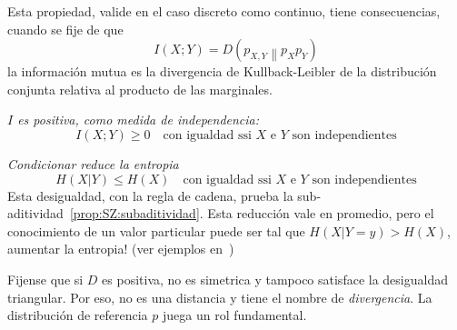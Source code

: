 
Esta propiedad, valide  en el caso discreto como  continuo, tiene consecuencias,
cuando  se fije  de que
%
\[
I(X;Y) = D \left( \left. p_{X,Y} \right\| p_X p_Y \right)
\]
%
\ie  la  informaci\'on  mutua  es  la  divergencia  de  Kullback-Leibler  de  la
distribuci\'on conjunta relativa al producto de las marginales.
%
\begin{propiedades}
\item\label{prop:SZ:Ipositive}   {\it   $I$   es   positiva,  como   medida   de
    independencia:}
  \[
  I(X;Y) \ge 0 \quad \mbox{con igualdad ssi $X$ e $Y$ son independientes}
  \]
%
\item\label{prop:SZ:condicionar} {\it  Condicionar reduce la  entropia}
  \[
  H(X|Y) \le H(X) \quad \mbox{con igualdad ssi $X$ e $Y$ son independientes}
  \]
  Esta    desigualdad,     con    la     regla    de    cadena,     prueba    la
  sub-aditividad~\ref{prop:SZ:subaditividad}.    Esta    reducci\'on   vale   en
  promedio, pero el conocimiento de un valor particular puede ser tal que $H(X|Y
  = y) > H(X)$, \ie aumentar la entropia!  (ver ejemplos en~\cite[p.~59]{Rio07})
\end{propiedades}

Fijense  que  si  $D$ es  positiva,  no  es  simetrica  y tampoco  satisface  la
desigualdad triangular. Por  eso, no es una distancia y tiene  el nombre de {\it
  divergencia}. La distribuci\'on de referencia $p$ juega un rol fundamental.



\label{s:SZ:Desigualdades}




\label{sec:SZ:MaxEnt}

